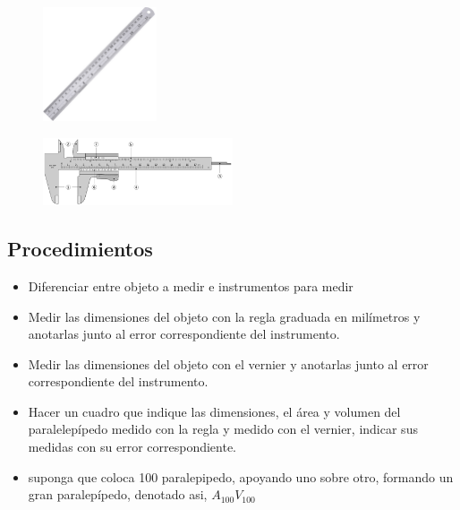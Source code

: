 \documentclass[10pt]{article}
\begin{document}
\begin{figure}[H]
	\begin{center}
 		\includegraphics[width = 0.3\textwidth]{Imagenes/regla.jpg}
	\end{center} 
\end{figure}

\begin{figure}[H]
	\begin{center}
 		\includegraphics[width = 0.5\textwidth]{Imagenes/vernier.png}
	\end{center} 
\end{figure}

\subsection{Procedimientos}
\begin{itemize}
    \item Diferenciar entre objeto a medir e instrumentos para medir
    \item Medir las dimensiones del objeto con la regla graduada en milímetros y anotarlas junto al error correspondiente del instrumento.
    \item Medir las dimensiones del objeto con el vernier y anotarlas junto al error correspondiente del instrumento.
    \item Hacer un cuadro que indique las dimensiones, el área y volumen del paralelepípedo medido con la regla y medido con el vernier, indicar sus medidas con su error correspondiente.
    \item suponga que coloca 100 paralepipedo, apoyando uno sobre otro, formando un gran paralepípedo, denotado asi, $A_{100} V_{100}$
\end{itemize}
\end{document}
